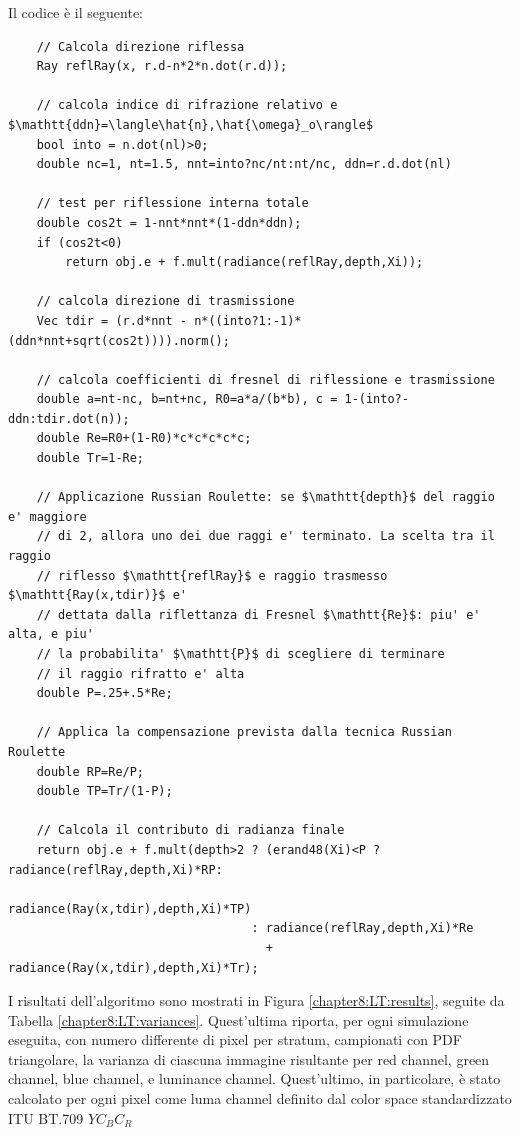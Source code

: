 Il codice \`e il seguente:
\begin{verbatim}
	// Calcola direzione riflessa
	Ray reflRay(x, r.d-n*2*n.dot(r.d));

	// calcola indice di rifrazione relativo e $\mathtt{ddn}=\langle\hat{n},\hat{\omega}_o\rangle$
	bool into = n.dot(nl)>0;
	double nc=1, nt=1.5, nnt=into?nc/nt:nt/nc, ddn=r.d.dot(nl)

	// test per riflessione interna totale
	double cos2t = 1-nnt*nnt*(1-ddn*ddn);
	if (cos2t<0)
		return obj.e + f.mult(radiance(reflRay,depth,Xi));

	// calcola direzione di trasmissione
	Vec tdir = (r.d*nnt - n*((into?1:-1)*(ddn*nnt+sqrt(cos2t)))).norm();

	// calcola coefficienti di fresnel di riflessione e trasmissione
	double a=nt-nc, b=nt+nc, R0=a*a/(b*b), c = 1-(into?-ddn:tdir.dot(n));
	double Re=R0+(1-R0)*c*c*c*c*c;
	double Tr=1-Re;

	// Applicazione Russian Roulette: se $\mathtt{depth}$ del raggio e' maggiore 
	// di 2, allora uno dei due raggi e' terminato. La scelta tra il raggio 
	// riflesso $\mathtt{reflRay}$ e raggio trasmesso $\mathtt{Ray(x,tdir)}$ e' 
	// dettata dalla riflettanza di Fresnel $\mathtt{Re}$: piu' e' alta, e piu' 
	// la probabilita' $\mathtt{P}$ di scegliere di terminare 
	// il raggio rifratto e' alta
	double P=.25+.5*Re;

	// Applica la compensazione prevista dalla tecnica Russian Roulette
	double RP=Re/P;
	double TP=Tr/(1-P);

	// Calcola il contributo di radianza finale
	return obj.e + f.mult(depth>2 ? (erand48(Xi)<P ? radiance(reflRay,depth,Xi)*RP:
	                                                 radiance(Ray(x,tdir),depth,Xi)*TP)
	                              : radiance(reflRay,depth,Xi)*Re 
	                                + radiance(Ray(x,tdir),depth,Xi)*Tr);
\end{verbatim}
I risultati dell'algoritmo sono mostrati in Figura \ref{chapter8:LT:results}, seguite da Tabella \ref{chapter8:LT:variances}. Quest'ultima riporta, 
per ogni simulazione eseguita, con numero differente di pixel per stratum, campionati con PDF triangolare, la varianza di ciascuna immagine risultante
per red channel, green channel, blue channel, e luminance channel. Quest'ultimo, in particolare, \`e stato calcolato per ogni pixel come luma channel 
definito dal color space standardizzato ITU BT.709 $YC_BC_R$
